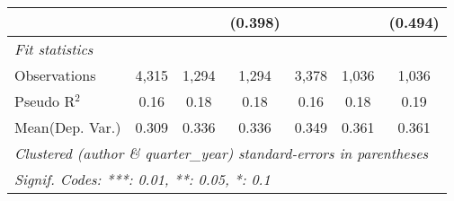 \begin{tabular}{lcccccc}
                           &         &         & (0.398)      &              &              & (0.494)\\   
   \midrule
   \emph{Fit statistics}\\
   Observations            & 4,315   & 1,294   & 1,294        & 3,378        & 1,036        & 1,036\\  
   Pseudo R$^2$            & 0.16    & 0.18    & 0.18         & 0.16         & 0.18         & 0.19\\  
Mean(Dep. Var.) & 0.309 & 0.336 & 0.336 & 0.349 & 0.361 & 0.361 \\
   \midrule \midrule
   \multicolumn{7}{l}{\emph{Clustered (author \& quarter\_year) standard-errors in parentheses}}\\
   \multicolumn{7}{l}{\emph{Signif. Codes: ***: 0.01, **: 0.05, *: 0.1}}\\
\end{tabular}
\par\endgroup
